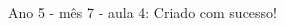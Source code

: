 Ano 5 - mês 7 - aula 4: Criado com sucesso!
\begin{multicols}{2}
\lipsum[1]
\vfill\null
\columnbreak
\lipsum[1]
\vfill
\pagebreak
\end{multicols}
